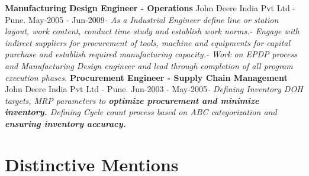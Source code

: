 \documentclass[11pt, a4paper]{awesome-cv}
\begin{document}
\textbf{Manufacturing Design Engineer - Operations} \hfill John Deere
India Pvt Ltd - Pune\newline . \hfill May-2005 -
Jun-2009\newline \textit{- \hspace{5mm}  As a Industrial Engineer define line or station layout, work content, conduct time study and establish work norms.\newline - \hspace{5mm}  Engage with indirect suppliers for procurement of tools, machine and equipments for capital purchase and establish required manufacturing capacity.\newline - \hspace{5mm}  Work on EPDP process and Manufacturing Design engineer and lead through completion of all program execution phases.}
\newline \vspace{2mm} \newline
\textbf{Procurement Engineer - Supply Chain Management} \hfill John
Deere India Pvt Ltd - Pune\newline . \hfill Jun-2003 -
May-2005\newline \textit{- \hspace{5mm}  Defining Inventory DOH targets,  MRP parameters to \textbf{optimize procurement and minimize inventory.} Defining Cycle count process based on ABC categorization and \textbf{ensuring inventory accuracy.}}
\newline \vspace{2mm} \newline

\hypertarget{distinctive-mentions}{%
\section{Distinctive Mentions}\label{distinctive-mentions}}
\end{document}
